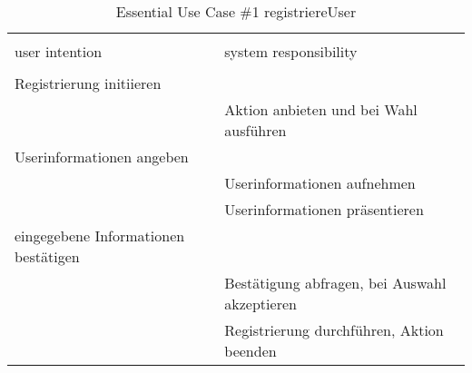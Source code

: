\begin{table}[H]
\caption{Essential Use Case \#1 registriereUser }
\centering
\begin{tabular}{l l}
\\ [-0.5ex]

\hline\hline
\\ [-0.5ex]
user intention & system responsibility
\\ [1.5ex]
\hline
\\ [-0.5ex]
Registrierung initiieren            &                                \\[1ex]
                              & Aktion anbieten und bei Wahl ausführen  \\[1ex]
Userinformationen angeben           &                                \\[1ex] 
                              & Userinformationen aufnehmen          \\[1ex]
                              & Userinformationen präsentieren       \\[1ex]
eingegebene Informationen bestätigen   &                                \\[1ex]
                              & Bestätigung abfragen, bei Auswahl akzeptieren  \\[1ex]
                              & Registrierung durchführen, Aktion beenden  \\[1ex]


\hline
\end{tabular}
\label{tab:registrieren}
\end{table}

